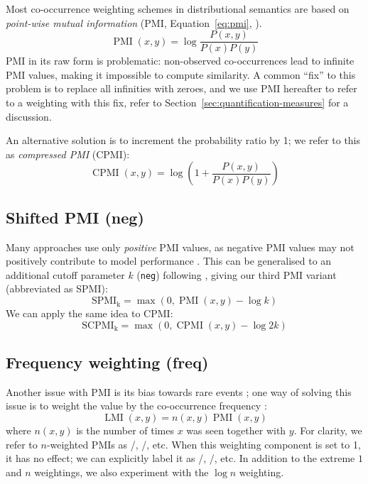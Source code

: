 Most co-occurrence weighting schemes in distributional semantics are based on \emph{point-wise mutual information} (PMI, Equation~\ref{eq:pmi}, ).
%
\begin{equation}
  \label{eq:pmi}
  \operatorname{PMI}(x, y) = \log\frac{P(x,y)}{P(x)P(y)}
\end{equation}
%
PMI in its raw form is problematic: non-observed co-occurrences lead to infinite PMI values, making it impossible to compute similarity. A common ``fix'' to this problem is to replace all infinities with zeroes, and we use PMI hereafter to refer to a weighting with this fix, refer to Section~\ref{sec:quantification-measures} for a discussion.

An alternative solution is to increment the probability ratio by 1; we refer to this as \textit{compressed PMI} (CPMI):
%
\begin{equation}
  \label{eq:cpmi}
  \operatorname{CPMI}(x, y) = \log\left( 1 +  \frac{P(x,y)}{P(x)P(y)} \right)
\end{equation}

\subsection{Shifted PMI (neg)}
\label{sec:shifted-pmi}

Many approaches use only \emph{positive} PMI values, as  negative PMI values may not positively contribute to model performance \cite{Turney:2010:FMV:1861751.1861756}. This can be generalised to an additional cutoff parameter $k$ (\texttt{neg}) following , giving our third PMI variant (abbreviated as SPMI):
%
\begin{equation}
  \label{eq:ppmi}
  \operatorname{SPMI_k} = \max (0, \operatorname{PMI}(x, y) - \log k)
\end{equation}
%
We can apply the same idea to CPMI:
%
\begin{equation}
  \label{eq:pcpmi}
  \operatorname{SCPMI_k} = \max (0, \operatorname{CPMI}(x, y) - \log 2k)
\end{equation}

\subsection{Frequency weighting (freq)}
\label{sec:frequency-weighting}

Another issue with PMI is its bias towards rare events \cite{TACL570}; one way of solving this issue is to weight the value by the co-occurrence frequency \cite{Evert05}:
%
\begin{equation}
  \label{eq:lmi}
  \operatorname{LMI}(x, y) = n(x, y)\operatorname{PMI}(x, y)
\end{equation}
%
where $n(x, y)$ is the number of times $x$ was seen together with $y$. For clarity, we refer to $n$-weighted PMIs as \NPMI/, \NSPMI/, etc. When this weighting component is set to 1, it has no effect; we can  explicitly label it as \PMI/, \SPMI/, etc. In addition to the extreme $1$ and $n$ weightings, we also experiment with the $\log n$ weighting.

